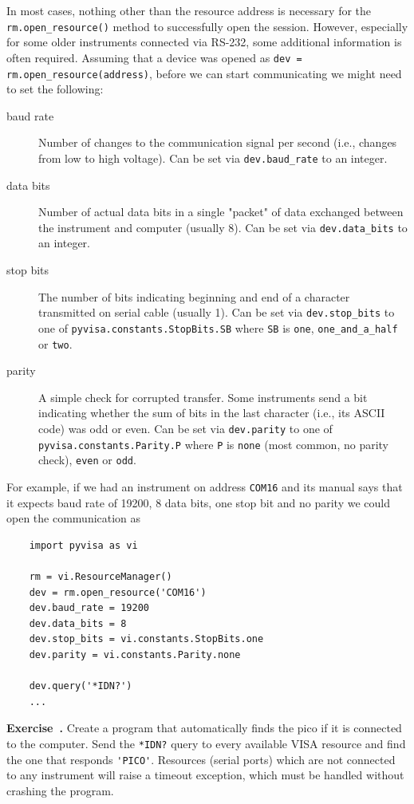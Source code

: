 \documentclass{article}
\newcommand{\ls}[1]{\lstinline{#1}}
\newcounter{exercise}
\newenvironment{exercise}[1][]%
    {\refstepcounter{exercise}%
    \begin{mdframed}[backgroundcolor=exercise,linecolor=white]%
    \textbf{Exercise~\theexercise.} #1 \rmfamily}%
    {\medskip\end{mdframed}}
\begin{document}
In most cases, nothing other than the resource address is necessary for the \ls{rm.open_resource()} method to successfully open the session. However, especially for some older instruments connected via RS-232, some additional information is often required. Assuming that a device was opened as \ls{dev = rm.open_resource(address)}, before we can start communicating we might need to set the following:
\begin{description}
    \item[baud rate] Number of changes to the communication signal per second (i.e., changes from low to high voltage). Can be set via \ls{dev.baud_rate} to an integer.
    \item[data bits] Number of actual data bits in a single "packet" of data exchanged between the instrument and computer (usually 8). Can be set via \ls{dev.data_bits} to an integer.
    \item[stop bits] The number of bits indicating beginning and end of a character transmitted on serial cable (usually 1). Can be set via \ls{dev.stop_bits} to one of \ls{pyvisa.constants.StopBits.SB} where \ls{SB} is \ls{one}, \ls{one_and_a_half} or \ls{two}.
    \item[parity] A simple check for corrupted transfer. Some instruments send a bit indicating whether the sum of bits in the last character (i.e., its ASCII code) was odd or even. Can be set via \ls{dev.parity} to one of \ls{pyvisa.constants.Parity.P} where \ls{P} is \ls{none} (most common, no parity check), \ls{even} or \ls{odd}.
\end{description}
For example, if we had an instrument on address \ls{COM16} and its manual says that it expects baud rate of 19200, 8 data bits, one stop bit and no parity we could open the communication as
\begin{lstlisting}
    import pyvisa as vi

    rm = vi.ResourceManager()
    dev = rm.open_resource('COM16')
    dev.baud_rate = 19200
    dev.data_bits = 8
    dev.stop_bits = vi.constants.StopBits.one
    dev.parity = vi.constants.Parity.none

    dev.query('*IDN?')
    ...
\end{lstlisting}

\begin{exercise}
    Create a program that automatically finds the pico if it is connected to the computer. Send the \ls{*IDN?} query to every available VISA resource and find the one that responds \ls{'PICO'}. Resources (serial ports) which are not connected to any instrument will raise a timeout exception, which must be handled without crashing the program.
\end{exercise}
\end{document}
